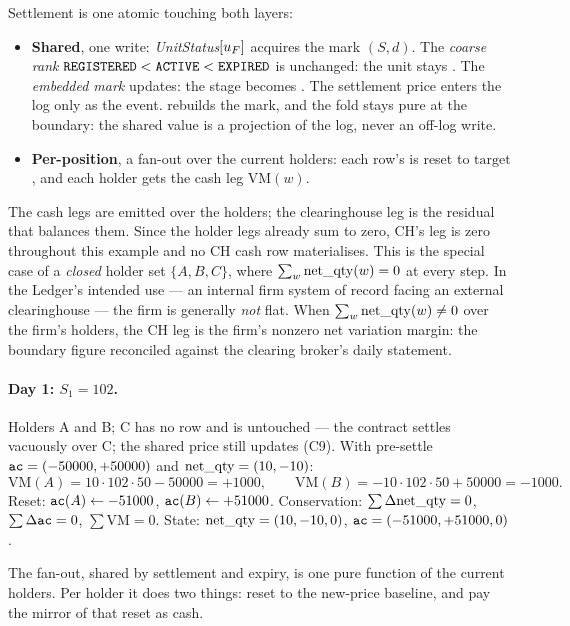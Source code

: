 Settlement is one atomic  touching both layers:
\begin{itemize}
\item \textbf{Shared}, one write: \emph{UnitStatus}$[u_{F}]$ acquires the mark $(S,d)$. The
\emph{coarse rank} $\texttt{REGISTERED}<\texttt{ACTIVE}<\texttt{EXPIRED}$ is unchanged: the unit stays
. The \emph{embedded mark} updates: the stage becomes
. The settlement price enters the log only as the
 event.  rebuilds the mark, and the fold stays pure at the
boundary: the shared value is a projection of the log, never an off-log write.
\item \textbf{Per-position}, a fan-out over the current holders: each row's \ac{} is reset to
$\mathrm{target}$, and each holder gets the cash leg $\mathrm{VM}(w)$.
\end{itemize}

\noindent The cash legs are emitted over the holders; the clearinghouse leg is the residual that
balances them. Since the holder legs already sum to zero, CH's leg is zero throughout this example and
no CH cash row materialises. This is the special case of a \emph{closed} holder set $\{A,B,C\}$, where
$\sum_w\mathrm{net\_qty}(w)=0$ at every step. In the Ledger's intended use --- an internal firm system of record
facing an external clearinghouse --- the firm is generally \emph{not} flat. When $\sum_w\mathrm{net\_qty}(w)\ne 0$
over the firm's holders, the CH leg is the firm's nonzero net variation margin: the boundary figure
reconciled against the clearing broker's daily statement.

\paragraph{Day 1: $S_1=102$.} Holders A and B; C has no row and is untouched --- the contract settles
vacuously over C; the shared price still updates (C9). With pre-settle $\texttt{ac}=(-50000,+50000)$ and
$\mathrm{net\_qty}=(10,-10)$:
\[
\mathrm{VM}(A) = 10\cdot 102\cdot 50 - 50000 = +1000,\qquad
\mathrm{VM}(B) = -10\cdot 102\cdot 50 + 50000 = -1000.
\]
Reset: $\texttt{ac}(A)\leftarrow -51000$, $\texttt{ac}(B)\leftarrow +51000$. Conservation: $\sum\Delta\mathrm{net\_qty}=0$,
$\sum\Delta\texttt{ac} = 0$, $\sum\mathrm{VM}=0$. State: $\mathrm{net\_qty}=(10,-10,0)$, $\texttt{ac}=(-51000,+51000,0)$.

The fan-out, shared by settlement and expiry, is one pure function of the current holders. Per
holder it does two things: reset \ac{} to the new-price baseline, and pay the mirror of that reset
as cash.

